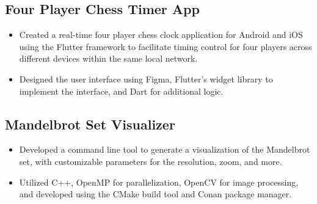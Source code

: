 \documentclass{article}
\begin{document}
\subsection*{Four Player Chess Timer App}

\begin{itemize}
	\item Created a real-time four player chess clock application for Android and iOS using the Flutter framework to facilitate timing control for four players across different devices within the same local network. 
	\item Designed the user interface using Figma, \hspace{49152sp}Flutter's widget library to implement the interface, and Dart for additional logic.
\end{itemize}

\subsection*{Mandelbrot Set Visualizer}

\begin{itemize}
	\item Developed a command line tool to generate a visualization of the Mandelbrot set, with customizable parameters for the resolution, zoom, and more.
	\item Utilized C++, OpenMP for parallelization, OpenCV for image processing, and developed using the CMake build tool and Conan package manager.
\end{itemize}



\end{document}
